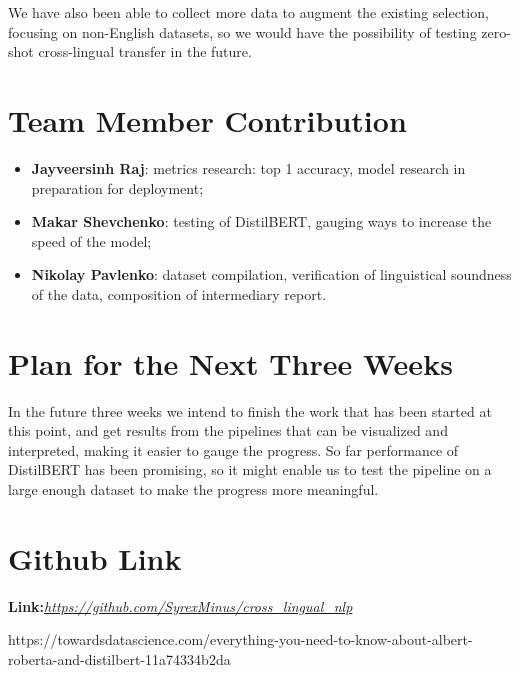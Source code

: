 \documentclass[]{article}
\begin{document}
	We have also been able to collect more data to augment the existing selection, focusing on non-English datasets, so we would have the possibility of testing zero-shot cross-lingual transfer in the future. 
	
	\section{Team Member Contribution}
	
	\begin{itemize}
		\item \textbf{Jayveersinh Raj}: metrics research: top 1 accuracy, model research in preparation for deployment;
		\item \textbf{Makar Shevchenko}: testing of DistilBERT, gauging ways to increase the speed of the model;
		\item \textbf{Nikolay Pavlenko}: dataset compilation, verification of linguistical soundness of the data, composition of intermediary report. 
	\end{itemize}
	
	\section{Plan for the Next Three Weeks}
	
	In the future three weeks we intend to finish the work that has been started at this point, and get results from the pipelines that can be visualized and interpreted, making it easier to gauge the progress. So far performance of DistilBERT has been promising, so it might enable us to test the pipeline on a large enough dataset to make the progress more meaningful. 
	
	\section{Github Link}
	\textbf{Link:}\href{https://github.com/SyrexMinus/cross\_lingual\_nlp}{\emph{https://github.com/SyrexMinus/cross\_lingual\_nlp}}
	
	\begin{thebibliography}{9}
		 https://towardsdatascience.com/everything-you-need-to-know-about-albert-roberta-and-distilbert-11a74334b2da
	\end{thebibliography}
	
\end{document}
